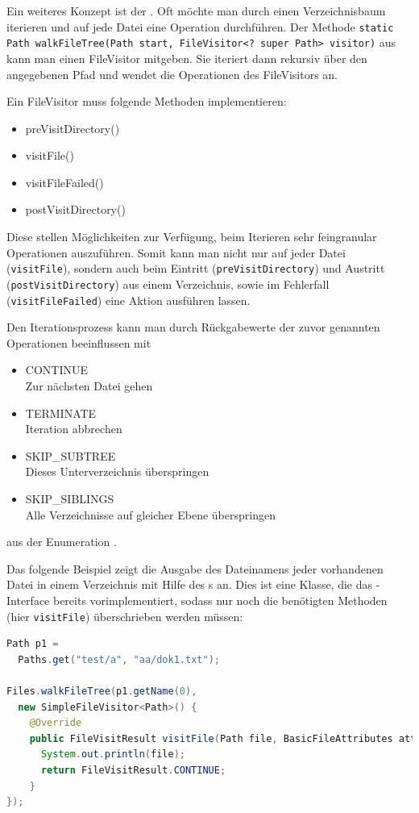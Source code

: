 \documentclass[times, 10pt,twocolumn]{article}
\begin{document}
Ein weiteres Konzept ist der . Oft möchte man durch einen Verzeichnisbaum iterieren und auf jede Datei eine
Operation durchführen.
Der Methode \texttt{static Path walkFileTree(Path start, FileVisitor<? super Path> visitor)} aus  kann man einen
FileVisitor mitgeben. Sie iteriert dann rekursiv über den angegebenen Pfad und wendet die Operationen des FileVisitors an.

Ein FileVisitor muss folgende Methoden implementieren:
\begin{itemize}
  \item preVisitDirectory()
  \item visitFile()
  \item visitFileFailed()
  \item postVisitDirectory()
\end{itemize}
Diese stellen Möglichkeiten zur Verfügung, beim Iterieren sehr feingranular Operationen auszuführen. Somit kann man nicht nur auf jeder Datei (\texttt{visitFile}), sondern auch beim Eintritt (\texttt{preVisitDirectory}) und Austritt (\texttt{postVisitDirectory})
aus einem Verzeichnis, sowie im Fehlerfall (\texttt{visitFileFailed}) eine Aktion ausführen lassen.

Den Iterationsprozess kann man durch Rückgabewerte der zuvor genannten Operationen beeinflussen mit
\begin{itemize}
  \item CONTINUE\\
  Zur nächsten Datei gehen
  \item TERMINATE\\
  Iteration abbrechen
  \item SKIP\_SUBTREE\\
  Dieses Unterverzeichnis überspringen
  \item SKIP\_SIBLINGS\\
  Alle Verzeichnisse auf gleicher Ebene überspringen
\end{itemize}
aus der Enumeration .

Das folgende Beispiel zeigt die Ausgabe des Dateinamens jeder vorhandenen Datei in einem Verzeichnis mit Hilfe des
s an. Dies ist eine Klasse, die das -Interface bereits vorimplementiert, sodass nur noch die benötigten Methoden (hier \texttt{visitFile}) überschrieben werden müssen:
\begin{lstlisting}[language=java,breaklines=true]
Path p1 = 
  Paths.get("test/a", "aa/dok1.txt");

Files.walkFileTree(p1.getName(0), 
  new SimpleFileVisitor<Path>() {
	@Override
	public FileVisitResult visitFile(Path file, BasicFileAttributes attrs) throws IOException {
      System.out.println(file);
      return FileVisitResult.CONTINUE;
	}
});
\end{lstlisting}
\end{document}
